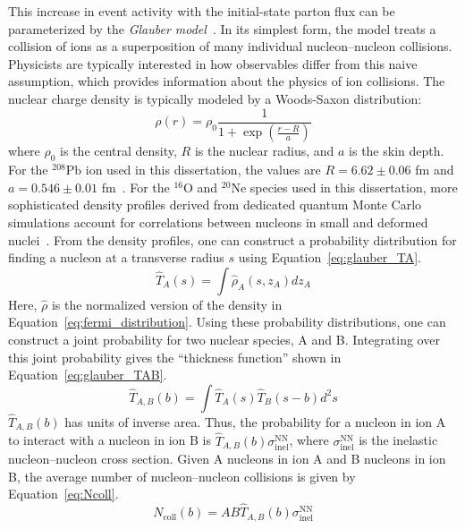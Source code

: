 This increase in event activity with the initial-state parton flux can be parameterized by the \textit{Glauber model}~\cite{Glauber}.
In its simplest form, the model treats a collision of ions as a superposition of many individual nucleon--nucleon collisions.
Physicists are typically interested in how observables differ from this naive assumption, which provides information about the physics of ion collisions.
The nuclear charge density is typically modeled by a Woods-Saxon distribution:
\begin{equation}
    \label{eq:fermi_distribution}
    \rho(r) = \rho_0\frac{1}{1+\exp{\left(\frac{r-R}{a}\right)}}
\end{equation}
where $\rho_0$ is the central density, $R$ is the nuclear radius, and $a$ is the skin depth.
For the ${}^{208}\mathrm{Pb}$ ion used in this dissertation, the values are $R = 6.62 \pm 0.06$ fm and $a = 0.546 \pm 0.01$ fm~\cite{Glauber:PbNuclearRho}.
For the ${}^{16}\mathrm{O}$ and ${}^{20}\mathrm{Ne}$ species used in this dissertation, more sophisticated density profiles derived from dedicated quantum Monte Carlo simulations account for correlations between nucleons in small and deformed nuclei~\cite{Glauber:LightIon}.
From the density profiles, one can construct a probability distribution for finding a nucleon at a transverse radius $s$ using Equation~\ref{eq:glauber_TA}.
\begin{equation}
    \label{eq:glauber_TA}
    \hat{T}_A(s) = \int \hat{\rho}_A\left(s,z_A\right)dz_A
\end{equation}
Here, $\hat{\rho}$ is the normalized version of the density in Equation~\ref{eq:fermi_distribution}.
Using these probability distributions, one can construct a joint probability for two nuclear species, A and B. Integrating over this joint probability gives the ``thickness function'' shown in Equation~\ref{eq:glauber_TAB}.
\begin{equation}
    \label{eq:glauber_TAB}
    \hat{T}_{A,B}(b) = \int \hat{T}_A(s)\hat{T}_B(s-b)d^2s
\end{equation}
$\hat{T}_{A,B}(b)$ has units of inverse area. Thus, the probability for a nucleon in ion A to interact with a nucleon in ion B is $\hat{T}_{A,B}(b)\sigma^{\mathrm{NN}}_\mathrm{inel}$, where $\sigma^{\mathrm{NN}}_\mathrm{inel}$ is the inelastic nucleon--nucleon cross section.
Given A nucleons in ion A and B nucleons in ion B, the average number of nucleon--nucleon collisions is given by Equation~\ref{eq:Ncoll}.
\begin{equation}
    \label{eq:Ncoll}
    N_{\mathrm{coll}}(b) = A B \hat{T}_{A,B}(b) \sigma^{\mathrm{NN}}_\mathrm{inel}
\end{equation}

